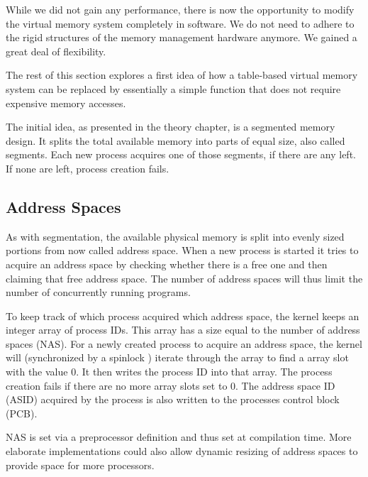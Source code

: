 While we did not gain any performance, there is now the opportunity to modify the virtual memory system
completely in software. We do not need to adhere to the rigid structures \cite{tanenbaumOS} of the memory management hardware anymore.
We gained a great deal of flexibility.

The rest of this section explores a first idea of how a table-based virtual memory system can be
replaced by essentially a simple function that does not require expensive memory accesses.

The initial idea, as presented in the theory chapter, is a segmented memory design. It splits the total
available memory into parts of equal size, also called segments.
Each new process acquires one of those segments, if there are any left. If none are left, process creation fails.

\subsection{Address Spaces}
As with segmentation, the available physical memory is split into evenly sized portions
from now called address space. When a new process is started it tries to acquire an address space by
checking whether there is a free one and then claiming that free address space.
The number of address spaces will thus limit the number of concurrently running programs.

To keep track of which process acquired which address space, the kernel keeps an integer array of process IDs.
This array has a size equal to the number of address spaces (NAS).
For a newly created process to acquire an address space, the kernel will (synchronized by a spinlock \cite{cox2011xv6})
iterate through the array to find a array slot with the value 0. It then writes the process ID into that array.
The process creation fails if there are no more array slots set to 0.
The address space ID (ASID) acquired by the process is also written to the processes control block (PCB).

NAS is set via a preprocessor definition and thus set at compilation time. More elaborate implementations
could also allow dynamic resizing of address spaces to provide space for more processors.

